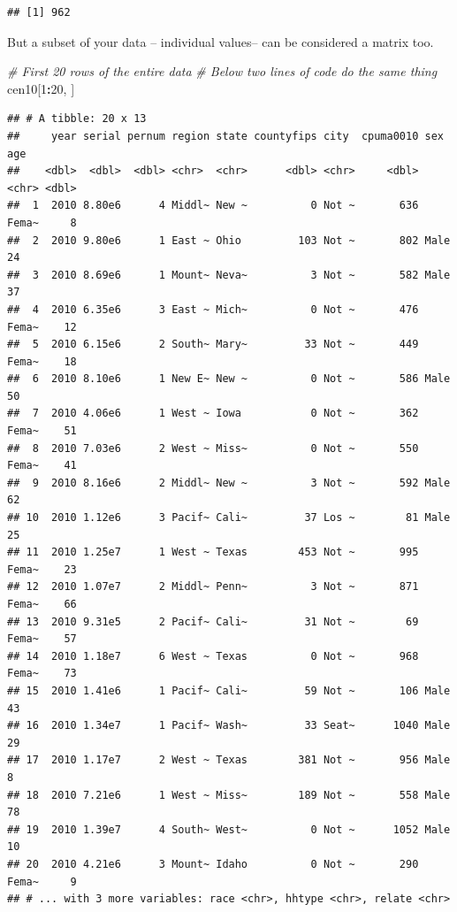 \documentclass[]{book}
\newenvironment{Shaded}{\begin{snugshade}}{\end{snugshade}}
\newcommand{\CommentTok}[1]{\textcolor[rgb]{0.56,0.35,0.01}{\textit{#1}}}
\newcommand{\DecValTok}[1]{\textcolor[rgb]{0.00,0.00,0.81}{#1}}
\newcommand{\NormalTok}[1]{#1}
\newcommand{\OperatorTok}[1]{\textcolor[rgb]{0.81,0.36,0.00}{\textbf{#1}}}
\theoremstyle{definition}
\theoremstyle{definition}
\theoremstyle{definition}
\theoremstyle{remark}
\begin{document}
\begin{verbatim}
## [1] 962
\end{verbatim}

But a subset of your data -- individual values-- can be considered a matrix too.

\begin{Shaded}
\begin{Highlighting}[]
\CommentTok{# First 20 rows of the entire data}
\CommentTok{# Below two lines of code do the same thing}
\NormalTok{cen10[}\DecValTok{1}\OperatorTok{:}\DecValTok{20}\NormalTok{, ]}
\end{Highlighting}
\end{Shaded}

\begin{verbatim}
## # A tibble: 20 x 13
##     year serial pernum region state countyfips city  cpuma0010 sex     age
##    <dbl>  <dbl>  <dbl> <chr>  <chr>      <dbl> <chr>     <dbl> <chr> <dbl>
##  1  2010 8.80e6      4 Middl~ New ~          0 Not ~       636 Fema~     8
##  2  2010 9.80e6      1 East ~ Ohio         103 Not ~       802 Male     24
##  3  2010 8.69e6      1 Mount~ Neva~          3 Not ~       582 Male     37
##  4  2010 6.35e6      3 East ~ Mich~          0 Not ~       476 Fema~    12
##  5  2010 6.15e6      2 South~ Mary~         33 Not ~       449 Fema~    18
##  6  2010 8.10e6      1 New E~ New ~          0 Not ~       586 Male     50
##  7  2010 4.06e6      1 West ~ Iowa           0 Not ~       362 Fema~    51
##  8  2010 7.03e6      2 West ~ Miss~          0 Not ~       550 Fema~    41
##  9  2010 8.16e6      2 Middl~ New ~          3 Not ~       592 Male     62
## 10  2010 1.12e6      3 Pacif~ Cali~         37 Los ~        81 Male     25
## 11  2010 1.25e7      1 West ~ Texas        453 Not ~       995 Fema~    23
## 12  2010 1.07e7      2 Middl~ Penn~          3 Not ~       871 Fema~    66
## 13  2010 9.31e5      2 Pacif~ Cali~         31 Not ~        69 Fema~    57
## 14  2010 1.18e7      6 West ~ Texas          0 Not ~       968 Fema~    73
## 15  2010 1.41e6      1 Pacif~ Cali~         59 Not ~       106 Male     43
## 16  2010 1.34e7      1 Pacif~ Wash~         33 Seat~      1040 Male     29
## 17  2010 1.17e7      2 West ~ Texas        381 Not ~       956 Male      8
## 18  2010 7.21e6      1 West ~ Miss~        189 Not ~       558 Male     78
## 19  2010 1.39e7      4 South~ West~          0 Not ~      1052 Male     10
## 20  2010 4.21e6      3 Mount~ Idaho          0 Not ~       290 Fema~     9
## # ... with 3 more variables: race <chr>, hhtype <chr>, relate <chr>
\end{verbatim}
\end{document}
